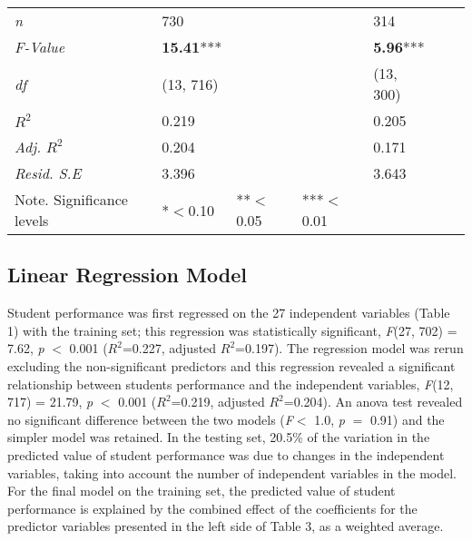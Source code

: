 \documentclass[sigconf]{acmart}
\begin{document}
\begin{table*}[ht]
\begin{tabular}{lllllll}
    \midrule
    \textit{n}          &       730          &       &        &         314         &       &       \\
    \textit{F-Value}    & \textbf{15.41}***  &       &        & \textbf{5.96}***    &       &       \\
    \textit{df}         &   (13, 716)        &       &        &      (13, 300)      &       &       \\
    \textit{$R^2$}      &      0.219         &       &        &         0.205       &       &       \\ 
    \textit{Adj. $R^2$} &      0.204         &       &        &         0.171       &       &       \\
    \textit{Resid. S.E} &      3.396         &       &        &         3.643       &       &       \\
    \bottomrule
    Note. Significance levels & *$<$0.10      & **$<$0.05  & ***$<$0.01 & & &
  \end{tabular}
\end{table*}



\subsection{Linear Regression Model}

Student performance was first regressed on the 27 independent variables 
(Table 1) with the training set; this regression was statistically significant, 
\textit{F}(27, 702) = 7.62, \textit{p} $<$ 0.001 ($R^2$=0.227, adjusted 
$R^2$=0.197). The regression model was rerun excluding the non-significant 
predictors and this regression revealed a significant relationship between
students performance and the independent variables, \textit{F}(12, 717) = 21.79, 
\textit{p} $<$ 0.001 ($R^2$=0.219, adjusted $R^2$=0.204). An anova test revealed 
no significant difference between the two models (\textit{F}$<$ 1.0, 
\textit{p} $=$ 0.91) and the simpler model was retained. In the testing set,
20.5\% of the variation in the predicted value of student performance was due to 
changes in the independent variables, taking into account the number of 
independent variables in the model. For the final model on the training set, 
the predicted value of student performance is explained by the combined effect 
of the coefficients for the predictor variables presented in the left side of 
Table 3, as a weighted average.
\end{document}
